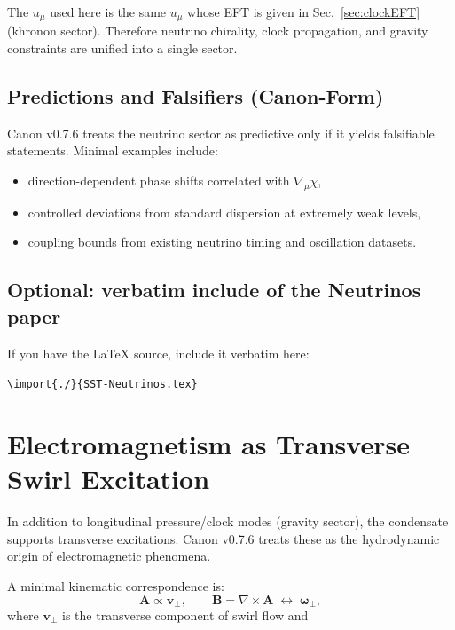 \documentclass[10pt]{article}
\begin{document}
The $u_\mu$ used here is the same $u_\mu$ whose EFT is given in
Sec.~\ref{sec:clockEFT} (khronon sector). Therefore neutrino chirality,
clock propagation, and gravity constraints are unified into a single sector.

\subsection{Predictions and Falsifiers (Canon-Form)}

Canon v0.7.6 treats the neutrino sector as predictive only if it yields
falsifiable statements. Minimal examples include:
\begin{itemize}
    \item direction-dependent phase shifts correlated with $\nabla_\mu\chi$,
    \item controlled deviations from standard dispersion at extremely weak levels,
    \item coupling bounds from existing neutrino timing and oscillation datasets.
\end{itemize}

\subsection{Optional: verbatim include of the Neutrinos paper}

If you have the LaTeX source, include it verbatim here:
\begin{center}
\texttt{\textbackslash import\{./\}\{SST-Neutrinos.tex\}}
\end{center}

    \section{Electromagnetism as Transverse Swirl Excitation}
    \label{sec:em_swirl}

    In addition to longitudinal pressure/clock modes (gravity sector), the condensate
    supports transverse excitations. Canon v0.7.6 treats these as the hydrodynamic
    origin of electromagnetic phenomena.

    A minimal kinematic correspondence is:
    \begin{equation}
        \mathbf{A} \propto \mathbf{v}_\perp,
        \qquad
        \mathbf{B}=\nabla\times\mathbf{A}\;\leftrightarrow\;\boldsymbol{\omega}_\perp,
    \end{equation}
    where $\mathbf{v}_\perp$ is the transverse component of swirl flow and
\end{document}
